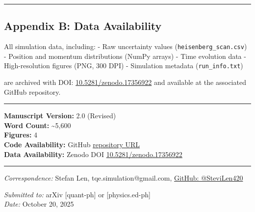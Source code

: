 \documentclass[
]{article}
\begin{document}
\begin{center}\rule{0.5\linewidth}{0.5pt}\end{center}

\subsection{Appendix B: Data
Availability}\label{appendix-b-data-availability}

All simulation data, including: - Raw uncertainty values
(\texttt{heisenberg\_scan.csv}) - Position and momentum distributions
(NumPy arrays) - Time evolution data - High-resolution figures (PNG, 300
DPI) - Simulation metadata (\texttt{run\_info.txt})

are archived with DOI:
\href{https://doi.org/10.5281/zenodo.17390177}{10.5281/zenodo.17356922}
and available at the associated GitHub repository.

\begin{center}\rule{0.5\linewidth}{0.5pt}\end{center}

\textbf{Manuscript Version:} 2.0 (Revised)\\
\textbf{Word Count:} \textasciitilde5,600\\
\textbf{Figures:} 4\\
\textbf{Code Availability:} GitHub
\href{https://github.com/SteviLen420/Heisenberg_Uncertainty_Simulation/tree/main/Heisenberg_Uncertainty_pipeline}{repository
URL}\\
\textbf{Data Availability:} Zenodo DOI
\href{https://doi.org/10.5281/zenodo.17390177}{10.5281/zenodo.17356922}

\begin{center}\rule{0.5\linewidth}{0.5pt}\end{center}

\emph{Correspondence:} Stefan Len, tqe.simulation@gmail.com,
\href{https://github.com/SteviLen420/Heisenberg_Uncertainty_Simulation}{GitHub:
@SteviLen420}

\emph{Submitted to:} arXiv {[}quant-ph{]} or {[}physics.ed-ph{]}\\
\emph{Date:} October 20, 2025
\end{document}
